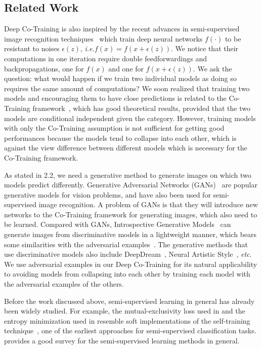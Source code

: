 \documentclass[runningheads]{llncs}
\begin{document}
\subsection{Related Work}
Deep Co-Training is also inspired by the recent advances in semi-supervised image recognition techniques~\cite{stoc_trans,tessl,vat,PseudoEnsembles,ladder1} which train deep neural networks $f(\cdot)$ to be resistant to noises $\epsilon(z)$, \textit{i.e.}$f(x) = f(x + \epsilon(z))$.
We notice that their computations in one iteration require double feedforwardings and backpropagations, one for $f(x)$ and one for $f(x+\epsilon(z))$.
We ask the question: what would happen if we train two individual models as doing so requires the same amount of computations?
We soon realized that training two models and encouraging them to have close predictions is related to the Co-Training framework~\cite{CoT}, which has good theoretical results, provided that the two models are conditional independent given the category.
However, training models with only the Co-Training assumption is not sufficient for getting good performances because the models tend to collapse into each other, which is against the view difference between different models which is necessary for the Co-Training framework.

As stated in 2.2, we need a generative method to generate images on which two models predict differently.
Generative Adversarial Networks (GANs)~\cite{badgan,igan,wgan} are popular generative models for vision problems, and have also been used for semi-supervised image recognition.
A problem of GANs is that they will introduce new networks to the Co-Training framework for generating images, which also need to be learned.
Compared with GANs, Introspective Generative Models~\cite{intro_cnn,intro} can generate images from discriminative models in a lightweight manner, which bears some similarities with the adversarial examples~\cite{adv}.
The generative methods that use discriminative models also include DeepDream~\cite{deepdream}, Neural Artistic Style~\cite{artistic}, \textit{etc}.
We use adversarial examples in our Deep Co-Training for its natural applicability to avoiding models from collapsing into each other by training each model with the adversarial examples of the others.

Before the work discussed above, semi-supervised learning in general has already been widely studied.
For example, the mutual-exclusivity loss used in \cite{stoc_trans} and the entropy minimization used in \cite{vat} resemble soft implementations of the self-training technique~\cite{selftraining1,selftraining2}, one of the earliest approaches for semi-supervised classification tasks.
\cite{ssl} provides a good survey for the semi-supervised learning methods in general.
\end{document}
